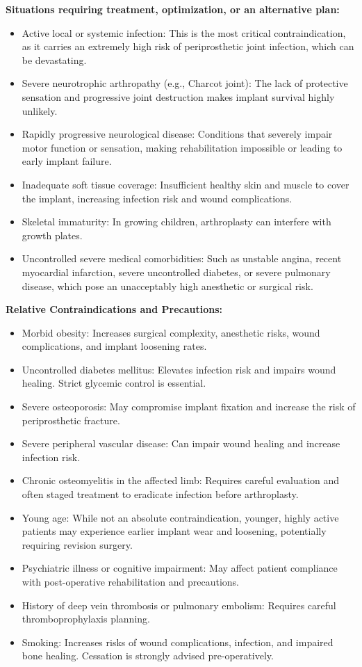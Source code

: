 \textbf{Situations requiring treatment, optimization, or an alternative plan:}
\begin{itemize}
  \item Active local or systemic infection: This is the most critical contraindication, as it carries an extremely high risk of periprosthetic joint infection, which can be devastating.
  \item Severe neurotrophic arthropathy (e.g., Charcot joint): The lack of protective sensation and progressive joint destruction makes implant survival highly unlikely.
  \item Rapidly progressive neurological disease: Conditions that severely impair motor function or sensation, making rehabilitation impossible or leading to early implant failure.
  \item Inadequate soft tissue coverage: Insufficient healthy skin and muscle to cover the implant, increasing infection risk and wound complications.
  \item Skeletal immaturity: In growing children, arthroplasty can interfere with growth plates.
  \item Uncontrolled severe medical comorbidities: Such as unstable angina, recent myocardial infarction, severe uncontrolled diabetes, or severe pulmonary disease, which pose an unacceptably high anesthetic or surgical risk.
\end{itemize}

\textbf{Relative Contraindications and Precautions:}
\begin{itemize}
  \item Morbid obesity: Increases surgical complexity, anesthetic risks, wound complications, and implant loosening rates.
  \item Uncontrolled diabetes mellitus: Elevates infection risk and impairs wound healing. Strict glycemic control is essential.
  \item Severe osteoporosis: May compromise implant fixation and increase the risk of periprosthetic fracture.
  \item Severe peripheral vascular disease: Can impair wound healing and increase infection risk.
  \item Chronic osteomyelitis in the affected limb: Requires careful evaluation and often staged treatment to eradicate infection before arthroplasty.
  \item Young age: While not an absolute contraindication, younger, highly active patients may experience earlier implant wear and loosening, potentially requiring revision surgery.
  \item Psychiatric illness or cognitive impairment: May affect patient compliance with post-operative rehabilitation and precautions.
  \item History of deep vein thrombosis or pulmonary embolism: Requires careful thromboprophylaxis planning.
  \item Smoking: Increases risks of wound complications, infection, and impaired bone healing. Cessation is strongly advised pre-operatively.
\end{itemize}

